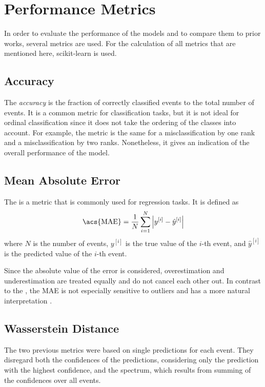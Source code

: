 \section{Performance Metrics}
In order to evaluate the performance of the models
and to compare them to prior works,
several metrics are used.
%
For the calculation of all metrics that are mentioned here,
scikit-learn \cite{sklearn} is used.


\subsection{Accuracy} \label{sec:unfolding:metrics:accuracy}
The \emph{accuracy} \cite{accuracy} is the fraction of correctly classified events to the total number of events.
It is a common metric for classification tasks,
but it is not ideal for ordinal classification
  since it does not take the ordering of the classes into account.
For example,
the metric is the same for
a misclassification by one rank
and a misclassification by two ranks.
%
Nonetheless,
it gives an indication of the overall performance of the model.


\subsection{Mean Absolute Error} \label{sec:unfolding:metrics:mae}
The  \cite{mae} is a metric that is commonly used for regression tasks. %
It is defined as
\begin{equation}
  \text{\acs{MAE}} = \frac{1}{N} \sum_{i=1}^N \left| y^{[i]} - \hat{y}^{[i]} \right|
\end{equation}
where $N$ is the number of events,
$y^{[i]}$ is the true value of the $i$-th event,
and $\hat{y}^{[i]}$ is the predicted value of the $i$-th event. %


Since the absolute value of the error is considered,
overestimation and underestimation are treated equally
and do not cancel each other out.
In contrast to the ,
the \ac{MAE} is not especially sensitive to outliers
and has a more natural interpretation \cite{mae}.


\subsection{Wasserstein Distance} \label{sec:unfolding:metrics:wd}
The two previous metrics were based on single predictions for each event.
They disregard both
  the confidences of the predictions,
    considering only the prediction with the highest confidence,
  and the spectrum,
    which results from summing of the confidences over all events.

